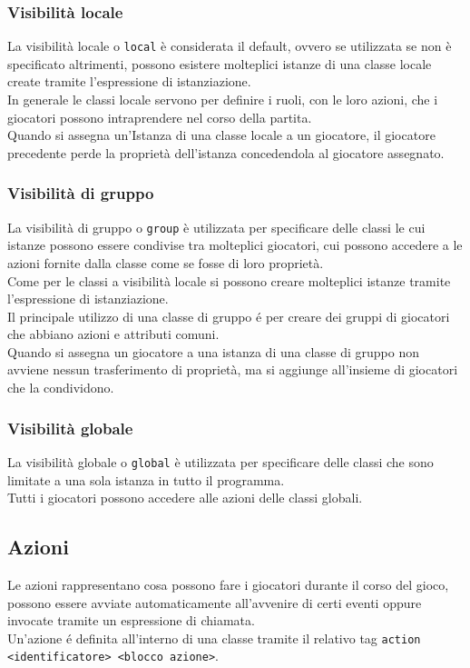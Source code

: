 \subsubsection{Visibilità locale}
La visibilità locale o \verb|local| è considerata il default, ovvero se utilizzata se non è specificato
altrimenti, possono esistere molteplici istanze di una classe locale create tramite l'espressione di istanziazione. \\
In generale le classi locale servono per definire i ruoli, con le loro azioni, che i giocatori possono
intraprendere nel corso della partita. \\
Quando si assegna un'Istanza di una classe locale a un giocatore, il giocatore precedente perde la proprietà dell'istanza
concedendola al giocatore assegnato.

\subsubsection{Visibilità di gruppo}
La visibilità di gruppo o \verb|group| è utilizzata per specificare delle classi le cui istanze possono
essere condivise tra molteplici giocatori, cui possono accedere a le azioni fornite dalla classe come 
se fosse di loro proprietà. \\
Come  per le classi a visibilità locale si possono creare molteplici istanze tramite l'espressione di istanziazione. \\
Il principale utilizzo di una classe di gruppo é per creare dei gruppi di giocatori che abbiano
azioni e attributi comuni. \\
Quando si assegna un giocatore a una istanza di una classe di gruppo non avviene nessun trasferimento
di proprietà, ma si aggiunge all'insieme di giocatori che la condividono.

\subsubsection{Visibilità globale}
La visibilità globale o \verb|global| è utilizzata per specificare delle classi che sono 
limitate a una sola istanza in tutto il programma. \\
Tutti i giocatori possono accedere alle azioni delle classi globali.

\subsection{Azioni}
Le azioni rappresentano cosa possono fare i giocatori durante il corso del gioco, possono essere avviate
automaticamente all'avvenire di certi eventi oppure invocate tramite un espressione di chiamata.\\
Un'azione é definita all'interno di una classe tramite il relativo tag \verb|action <identificatore> <blocco azione>|.

